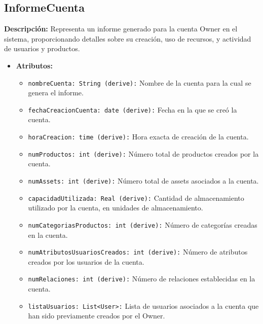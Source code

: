 \documentclass[12pt.a4paper]{article}
\begin{document}
\subsection{InformeCuenta}
\textbf{Descripción:} Representa un informe generado para la cuenta Owner en el sistema, proporcionando detalles sobre su creación, uso de recursos, y actividad de usuarios y productos.
    \begin{itemize}
        \item {\textbf{Atributos:}}
        \begin{itemize}
            \item \texttt{nombreCuenta: String (derive):} Nombre de la cuenta para la cual se genera el informe.
            \item \texttt{fechaCreacionCuenta: date (derive):} Fecha en la que se creó la cuenta.
            \item \texttt{horaCreacion: time (derive):} Hora exacta de creación de la cuenta.
            \item \texttt{numProductos: int (derive):} Número total de productos creados por la cuenta.
            \item \texttt{numAssets: int (derive):} Número total de assets asociados a la cuenta.
            \item \texttt{capacidadUtilizada: Real (derive):} Cantidad de almacenamiento utilizado por la cuenta, en unidades de almacenamiento.
            \item \texttt{numCategoriasProductos: int (derive):} Número de categorías creadas en la cuenta.
            \item \texttt{numAtributosUsuariosCreados: int (derive):} Número de atributos creados por los usuarios de la cuenta.
            \item \texttt{numRelaciones: int (derive):} Número de relaciones establecidas en la cuenta.
            \item \texttt{listaUsuarios: List<User>:} Lista de usuarios asociados a la cuenta que han sido previamente creados por el Owner.
        \end{itemize}
    \end{itemize}
\end{document}
